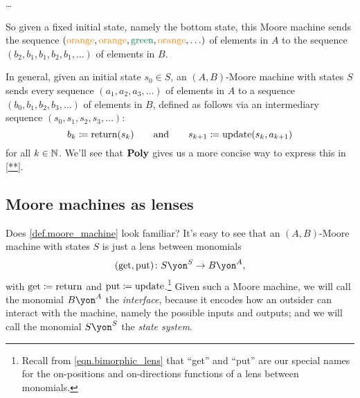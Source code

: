 \documentclass[Book-Poly]{subfiles}
\begin{document}
\begin{example}
\begin{enumerate}
    \ldots
    
    So given a fixed initial state, namely the bottom state, this Moore machine sends the sequence $({\color{orange}\text{orange}}, {\color{orange}\text{orange}}, {\color{dgreen}\text{green}}, {\color{orange}\text{orange}},\ldots)$ of elements in $A$ to the sequence $(b_2,b_1,b_1,b_2,b_1,\ldots)$ of elements in $B$.
\end{enumerate}
\end{example}

In general, given an initial state $s_0\in S$, an $(A,B)$-Moore machine with states $S$ sends every sequence $(a_1,a_2,a_3,\ldots)$ of elements in $A$ to a sequence $(b_0,b_1,b_2,b_3,\ldots)$ of elements in $B$, defined as follows via an intermediary sequence $(s_0,s_1,s_2,s_3,\ldots)$:
\[
    b_k\coloneqq \text{return}(s_k) \qquad\text{and}\qquad s_{k+1}\coloneqq \text{update}(s_k, a_{k+1})
\]
for all $k\in\mathbb{N}$.
We'll see that $\mathbf{Poly}$ gives us a more concise way to express this in \cref{**}.

\subsection{Moore machines as lenses}

Does \cref{def.moore_machine} look familiar?
It's easy to see that an $(A,B)$-Moore machine with states $S$ is just a lens between monomials
\[
(\lensget, \lensput)\colon S\yon^S\to B\yon^A,
\]
with $\mathrm{get}\coloneqq\text{return}$ and $\mathrm{put}\coloneqq\text{update}$.\footnote{Recall from \eqref{eqn.bimorphic_lens} that ``get'' and ``put'' are our special names for the on-positions and on-directions functions of a lens between monomials.}
Given such a Moore machine, we will call the monomial $B\yon^A$ the \emph{interface}, because it encodes how an outsider can interact with the machine, namely the possible inputs and outputs; and we will call the monomial $S\yon^S$ the \emph{state system}.
\end{document}
